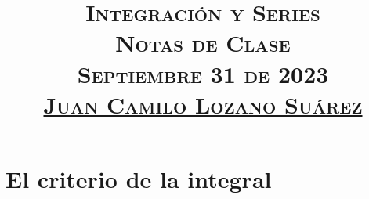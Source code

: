 \documentclass[letterpaper]{article} %
\title{
  \vspace{-1.5cm}
  \textsc{
    \Large{Integración y Series\\ Notas de Clase}\\ \vspace{0.2cm}
    \large{Septiembre 31 de 2023\\ \vspace{1cm} \underline{Juan Camilo Lozano Suárez}}\\
  }
}
\date{}
\begin{document}
  \maketitle
  \section{El criterio de la integral}
    
    
    
  
\end{document}

